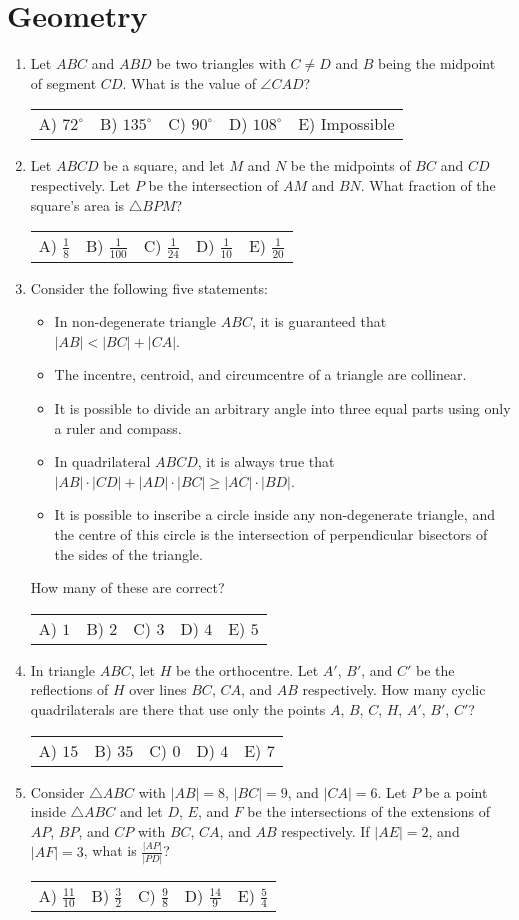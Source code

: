 \documentclass{article}
\newcommand{\answers}[5]{
  \begin{center}
    \begin{tabular}{*{5}{p{0.15\textwidth}}}
      A) #1 & B) #2 & C) #3 & D) #4 & E) #5
    \end{tabular}
  \end{center}
}
\begin{document}
\section{Geometry}
\begin{enumerate}

\item %
Let $ABC$ and $ABD$ be two triangles with $C \ne D$ and $B$ being the midpoint of segment $CD$.
What is the value of $\angle CAD$?
\answers{$72^\circ$}{$135^\circ$}{$90^\circ$}{$108^\circ$}{Impossible}

\item %
Let $ABCD$ be a square, and let $M$ and $N$ be the midpoints of $BC$ and $CD$ respectively.
Let $P$ be the intersection of $AM$ and $BN$.
What fraction of the square's area is $\triangle BPM$?
\answers{ $\frac{1}{8}$ }{ $\frac{1}{100}$ }{ $\frac{1}{24}$ }{ $\frac{1}{10}$ }{ $\frac{1}{20}$ }

\item %
Consider the following five statements:
\begin{itemize}
  \item In non-degenerate triangle $ABC$, it is guaranteed that $|AB| < |BC| + |CA|$.
  \item The incentre, centroid, and circumcentre of a triangle are collinear.
  \item It is possible to divide an arbitrary angle into three equal parts using only a ruler and compass.
  \item In quadrilateral $ABCD$, it is always true that $|AB| \cdot |CD| + |AD| \cdot |BC| \ge |AC| \cdot |BD|$.
  \item It is possible to inscribe a circle inside any non-degenerate triangle, and the centre of this circle is the intersection of perpendicular bisectors of the sides of the triangle.
\end{itemize}
How many of these are correct?
\answers{$1$}{$2$}{$3$}{$4$}{$5$}

\item %
In triangle $ABC$, let $H$ be the orthocentre.
Let $A'$, $B'$, and $C'$ be the reflections of $H$ over lines $BC$, $CA$, and $AB$ respectively.
How many cyclic quadrilaterals are there that use only the points $A$, $B$, $C$, $H$, $A'$, $B'$, $C'$?
\answers{$15$}{$35$}{$0$}{$4$}{$7$}

\item %
Consider $\triangle ABC$ with $|AB| = 8$, $|BC| = 9$, and $|CA| = 6$.
Let $P$ be a point inside $\triangle ABC$ and let $D$, $E$, and $F$ be the intersections of the extensions of $AP$, $BP$, and $CP$ with $BC$, $CA$, and $AB$ respectively.
If $|AE| = 2$, and $|AF| = 3$, what is $\frac{|AP|}{|PD|}$?
\answers{ $\frac{11}{10}$ }{ $\frac{3}{2}$ }{ $\frac{9}{8}$ }{ $\frac{14}{9}$ }{ $\frac{5}{4}$ }

\end{enumerate}
\end{document}
